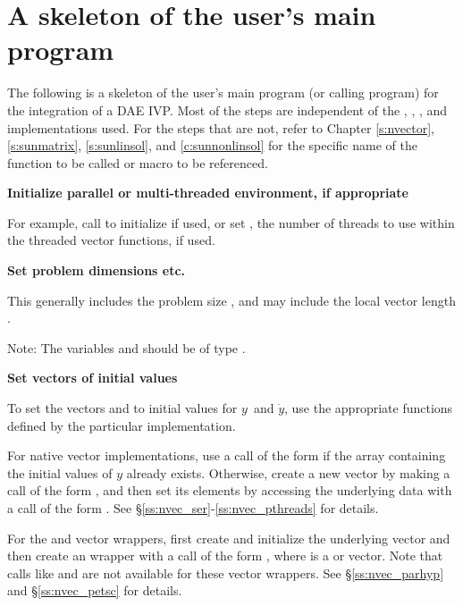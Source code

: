 \section{A skeleton of the user's main program}\label{ss:skeleton_sim}
The following is a skeleton of the user's main program (or calling program)
for the integration of a DAE IVP. Most of the steps are independent of the
{\nvector}, {\sunmatrix}, {\sunlinsol}, and {\sunnonlinsol} implementations
used. For the steps that are not, refer to Chapter \ref{s:nvector},
\ref{s:sunmatrix}, \ref{s:sunlinsol}, and \ref{c:sunnonlinsol} for the specific
name of the function to be called or macro to be referenced.
\begin{Steps}

\item
  {\bf Initialize parallel or multi-threaded environment, if appropriate}

  For example, call  to initialize {\mpi} if used, or
  set , the number of threads to use within the threaded
  vector functions, if used.

\item
  {\bf Set problem dimensions etc.}

  This generally includes the problem size , and may include
  the local vector length .

  Note: The variables  and  should be of type .

\item
  {\bf Set vectors of initial values}

  To set the vectors  and  to initial values for $y$\ and
  $\dot{y}$, use the appropriate functions defined by the particular
  {\nvector} implementation.

  For native {\sundials} vector implementations,
  use a call of the form  if the 
  array  containing the initial values of $y$ already exists.
  Otherwise, create a new vector by making a call of the form
  , and then set its elements by accessing
  the underlying data with a call of the form
  .
  See \S\ref{ss:nvec_ser}-\ref{ss:nvec_pthreads} for details.

  For the {\hypre} and {\petsc} vector wrappers, first create and initialize
  the underlying vector and then create an {\nvector} wrapper with a call
  of the form , where  is a {\hypre}
  or {\petsc} vector. Note that calls like  and
   are not available for these vector wrappers.
  See \S\ref{ss:nvec_parhyp} and \S\ref{ss:nvec_petsc} for details.


\end{Steps}
